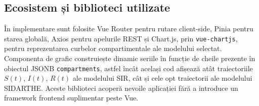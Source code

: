 \subsection{Ecosistem și biblioteci utilizate}
\label{subsec:vue_ecosistem}

În implementare sunt folosite Vue Router pentru rutare client-side, Pinia pentru
starea globală, Axios pentru apelurile REST și Chart.js, prin \texttt{vue-chartjs},
pentru reprezentarea curbelor compartimentale ale modelului selectat. Componenta
de grafic construiește dinamic seriile în funcție de cheile prezente în obiectul
JSONB \texttt{compartments}, astfel încât același cod afișează atât traiectoriile
$S(t)$, $I(t)$, $R(t)$ ale modelului SIR, cât și cele opt traiectorii ale
modelului SIDARTHE. Aceste biblioteci acoperă nevoile aplicației fără a introduce
un framework frontend suplimentar peste Vue.
